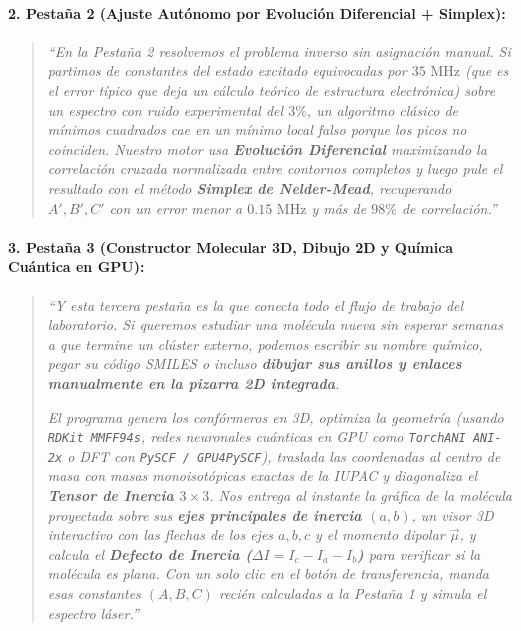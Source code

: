 \documentclass[11pt,letterpaper]{article}
\begin{document}
\paragraph{2. Pestaña 2 (Ajuste Autónomo por Evolución Diferencial + Simplex):}
\begin{quote}
\textit{``En la Pestaña 2 resolvemos el problema inverso sin asignación manual. Si partimos de constantes del estado excitado equivocadas por $35\text{ MHz}$ (que es el error típico que deja un cálculo teórico de estructura electrónica) sobre un espectro con ruido experimental del $3\%$, un algoritmo clásico de mínimos cuadrados cae en un mínimo local falso porque los picos no coinciden. Nuestro motor usa \textbf{Evolución Diferencial} maximizando la correlación cruzada normalizada entre contornos completos y luego pule el resultado con el método \textbf{Simplex de Nelder-Mead}, recuperando $A', B', C'$ con un error menor a $0.15\text{ MHz}$ y más de $98\%$ de correlación.''}
\end{quote}

\paragraph{3. Pestaña 3 (Constructor Molecular 3D, Dibujo 2D y Química Cuántica en GPU):}
\begin{quote}
\textit{``Y esta tercera pestaña es la que conecta todo el flujo de trabajo del laboratorio. Si queremos estudiar una molécula nueva sin esperar semanas a que termine un clúster externo, podemos escribir su nombre químico, pegar su código SMILES o incluso \textbf{dibujar sus anillos y enlaces manualmente en la pizarra 2D integrada}.}

\textit{El programa genera los confórmeros en 3D, optimiza la geometría (usando \texttt{RDKit MMFF94s}, redes neuronales cuánticas en GPU como \texttt{TorchANI ANI-2x} o DFT con \texttt{PySCF / GPU4PySCF}), traslada las coordenadas al centro de masa con masas monoisotópicas exactas de la IUPAC y diagonaliza el \textbf{Tensor de Inercia $3\times 3$}. Nos entrega al instante la gráfica de la molécula proyectada sobre sus \textbf{ejes principales de inercia $(a, b)$}, un visor 3D interactivo con las flechas de los ejes $a, b, c$ y el momento dipolar $\vec{\mu}$, y calcula el \textbf{Defecto de Inercia ($\Delta I = I_c - I_a - I_b$)} para verificar si la molécula es plana. Con un solo clic en el botón de transferencia, manda esas constantes $(A, B, C)$ recién calculadas a la Pestaña 1 y simula el espectro láser.''}
\end{quote}
\end{document}
